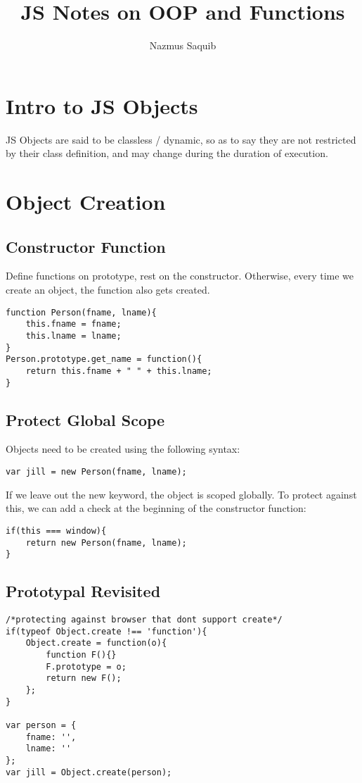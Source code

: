 \documentclass[12pt, a4paper]{article}
\begin{document}
\title{JS Notes on OOP and Functions}
\author{Nazmus Saquib}

\maketitle
\tableofcontents

\section{Intro to JS Objects}
JS Objects are said to be classless / dynamic, so as to say they are not restricted by their class definition,
 and may change during the duration of execution.

\section{Object Creation}
\subsection{Constructor Function}
Define functions on prototype, rest on the constructor. Otherwise, every time we create an object,
the function also gets created.
\begin{verbatim}
function Person(fname, lname){
	this.fname = fname;
	this.lname = lname;
}
Person.prototype.get_name = function(){
	return this.fname + " " + this.lname;
}
\end{verbatim}
\subsection{Protect Global Scope}
Objects need to be created using the following syntax:
\begin{verbatim}
var jill = new Person(fname, lname);
\end{verbatim}
If we leave out the new keyword, the object is scoped globally. To protect against this, we can add 
a check at the beginning of the constructor function:
\begin{verbatim}
if(this === window){
	return new Person(fname, lname);
}
\end{verbatim}
\subsection{Prototypal Revisited}
\begin{verbatim}
/*protecting against browser that dont support create*/
if(typeof Object.create !== 'function'){
	Object.create = function(o){
		function F(){}
		F.prototype = o;
		return new F();
	};
}

var person = {
	fname: '',
	lname: ''
};
var jill = Object.create(person);
\end{verbatim}
\end{document}
